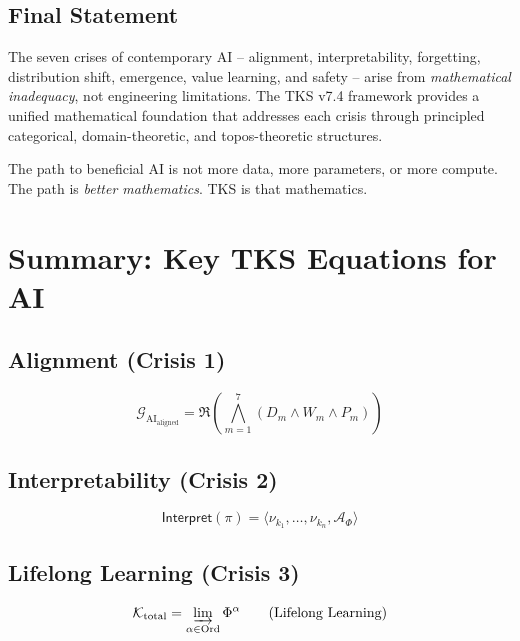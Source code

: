 \documentclass[11pt,twoside]{article}
\theoremstyle{definition}
\theoremstyle{plain}
\theoremstyle{remark}
\newcommand{\noe}[1]{\nu_{#1}}
\newcommand{\RPM}{\mathfrak{R}}
\newcommand{\TransFrac}[1]{\Phi^{#1}}
\newcommand{\FractalAttractor}{\mathcal{A}_\Phi}
\newcommand{\AIGoal}{\mathcal{G}_{\mathrm{AI}}}
\newcommand{\Interpret}{\mathsf{Interpret}}
\begin{document}
\subsection{Final Statement}

The seven crises of contemporary AI -- alignment, interpretability, forgetting,
distribution shift, emergence, value learning, and safety -- arise from
\emph{mathematical inadequacy}, not engineering limitations. The TKS v7.4 framework
provides a unified mathematical foundation that addresses each crisis through
principled categorical, domain-theoretic, and topos-theoretic structures.

The path to beneficial AI is not more data, more parameters, or more compute.
The path is \emph{better mathematics}. TKS is that mathematics.

\appendix
\section{Summary: Key TKS Equations for AI}
\label{app:equations}

\subsection*{Alignment (Crisis 1)}
\begin{equation}
\AIGoal_{\mathrm{aligned}} = \RPM\left(\bigwedge_{m=1}^{7} (D_m \wedge W_m \wedge P_m)\right)
\tag{Alignment}
\end{equation}

\subsection*{Interpretability (Crisis 2)}
\begin{equation}
\Interpret(\pi) = \langle \noe{k_1}, \ldots, \noe{k_n}, \FractalAttractor \rangle
\tag{Interpretability}
\end{equation}

\subsection*{Lifelong Learning (Crisis 3)}
\begin{equation}
\mathcal{K}_{\mathrm{total}} = \varinjlim_{\alpha \in \mathrm{Ord}} \TransFrac{\alpha}
\tag{Lifelong Learning}
\end{equation}
\end{document}
